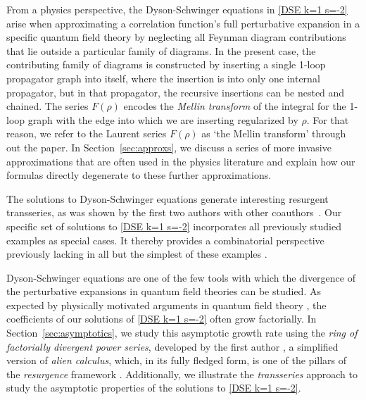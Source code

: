 \documentclass[oneside]{amsart}
\theoremstyle{definition}
\begin{document}
%

From a physics perspective, the Dyson-Schwinger equations in \eqref{DSE k=1 s=-2} arise when approximating a correlation function's full perturbative expansion in a specific quantum field theory by neglecting all Feynman diagram contributions that lie outside a particular family of diagrams. In the present case, the contributing family of diagrams is constructed by inserting a single 1-loop propagator graph into itself, where the insertion is into only one internal propagator, but in that propagator, the recursive insertions can be nested and chained. The series $F(\rho)$ encodes the \emph{Mellin transform} of the integral for the 1-loop graph with the edge into which we are inserting regularized by $\rho$. For that reason, we refer to the Laurent series $F(\rho)$ as `the Mellin transform' through out the paper. In Section~\ref{sec:approxs}, we discuss a series of more invasive approximations that are often used in the physics literature and explain how our formulas directly degenerate to these further approximations.

The solutions to Dyson-Schwinger equations \cite{bk30,bkerfc} generate interesting resurgent transseries, as was shown by the first two authors with other coauthors~\cite{BD,BDM,BB}. %
Our specific set of solutions to \eqref{DSE k=1 s=-2} incorporates all previously studied 
examples as special cases. It thereby provides a combinatorial perspective previously lacking in all but the simplest of these examples \cite{BD}. %
%

%
%
%
%

%
%
%
%
%
%

Dyson-Schwinger equations are one of the few tools with which the divergence of the perturbative expansions in quantum field theories can be studied. 
As expected by physically motivated
%
arguments in quantum field theory \cite{Dyson:1952tj}, the coefficients of our solutions of \eqref{DSE k=1 s=-2} often grow factorially.
In Section~\ref{sec:asymptotics}, we study this asymptotic growth rate using the \emph{ring of factorially divergent power series}, developed by the first author \cite{Bgenfun}, a simplified version of \emph{alien calculus}, which, in its fully fledged form, is one of the pillars of the \emph{resurgence} framework \cite{ecalle,MR3526111}. Additionally, we illustrate the \emph{transseries} approach to study the asymptotic properties of the solutions to \eqref{DSE k=1 s=-2}. %

%
\end{document}
